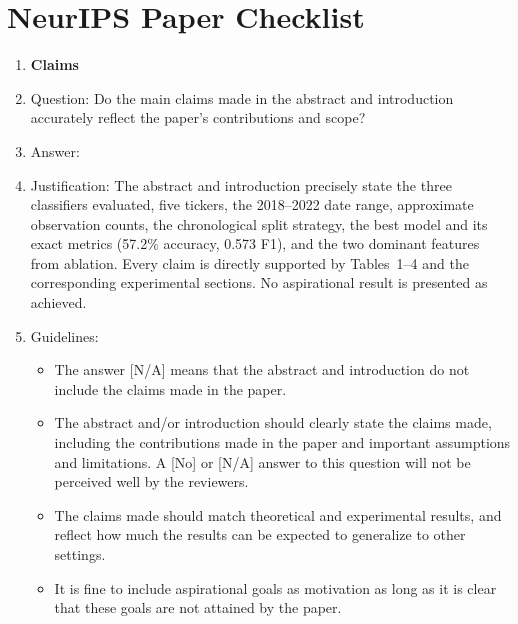 \documentclass{article}
\begin{document}
\newpage
\section*{NeurIPS Paper Checklist}

\begin{enumerate}

\item {\bf Claims}
    \item[] Question: Do the main claims made in the abstract and introduction accurately reflect the
paper's contributions and scope?
    \item[] Answer: \answerYes{}
    \item[] Justification: The abstract and introduction precisely state the three classifiers
    evaluated, five tickers, the 2018--2022 date range, approximate observation counts, the
    chronological split strategy, the best model and its exact metrics (57.2\% accuracy, 0.573
    F1), and the two dominant features from ablation. Every claim is directly supported by
    Tables~1--4 and the corresponding experimental sections. No aspirational result is presented
    as achieved.
    \item[] Guidelines:
    \begin{itemize}
        \item The answer [N/A] means that the abstract and introduction do not include the claims
made in the paper.
        \item The abstract and/or introduction should clearly state the claims made, including the
contributions made in the paper and important assumptions and limitations. A [No] or
[N/A] answer to this question will not be perceived well by the reviewers.
        \item The claims made should match theoretical and experimental results, and reflect how
much the results can be expected to generalize to other settings.
        \item It is fine to include aspirational goals as motivation as long as it is clear that these goals
are not attained by the paper.
    \end{itemize}


\end{enumerate}
\end{document}
